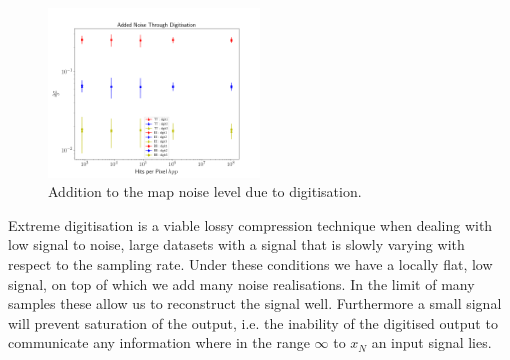 \documentclass[apj]{emulateapj}
\begin{document}
\begin{figure}[htb]\centering
\includegraphics[width=0.5\textwidth,clip]{Plots/addednoise.png}
  \caption[Current ]{
  Addition to the map noise level due to digitisation. 
           \label{fig:extranoise}
  }
\end{figure}

Extreme digitisation is a viable lossy compression technique when dealing with low signal to noise, large datasets with a signal that is slowly varying with respect to the sampling rate. Under these conditions we have a locally flat, low signal, on top of which we add many noise realisations. In the limit of many samples these allow us to reconstruct the signal well. Furthermore a small signal will prevent saturation of the output, i.e. the inability of the digitised output to communicate any information where in the range $\infty$ to $x_N$ an input signal lies.

\end{document}
